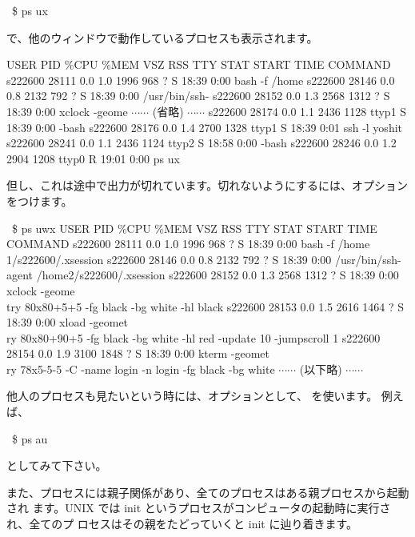 \documentclass[platex]{jsarticle}
\begin{document}
  \begin{terminal}~\$ ps ux\end{terminal}
  で、他のウィンドウで動作しているプロセスも表示されます。
  \begin{terminal}%
USER       PID \%CPU \%MEM   VSZ  RSS TTY      STAT START   TIME COMMAND
s222600  28111  0.0  1.0  1996  968 ?        S    18:39   0:00 bash -f /home
s222600  28146  0.0  0.8  2132  792 ?        S    18:39   0:00 /usr/bin/ssh-
s222600  28152  0.0  1.3  2568 1312 ?        S    18:39   0:00 xclock -geome
{\hfill $\cdots\cdots$ (省略) $\cdots\cdots$ \hfill}
s222600  28174  0.0  1.1  2436 1128 ttyp1    S    18:39   0:00 -bash
s222600  28176  0.0  1.4  2700 1328 ttyp1    S    18:39   0:01 ssh -l yoshit
s222600  28241  0.0  1.1  2436 1124 ttyp2    S    18:58   0:00 -bash
s222600  28246  0.0  1.2  2904 1208 ttyp0    R    19:01   0:00 ps ux\end{terminal}
  但し、これは途中で出力が切れています。切れないようにするには、オプション
   をつけます。
  \begin{terminal}%
~\$ ps uwx
USER       PID \%CPU \%MEM   VSZ  RSS TTY      STAT START   TIME COMMAND
s222600  28111  0.0  1.0  1996  968 ?        S    18:39   0:00 bash -f /home\\1/s222600/.xsession
s222600  28146  0.0  0.8  2132  792 ?        S    18:39   0:00 /usr/bin/ssh-\\agent /home2/s222600/.xsession
s222600  28152  0.0  1.3  2568 1312 ?        S    18:39   0:00 xclock -geome\\try 80x80+5+5 -fg black -bg white -hl black
s222600  28153  0.0  1.5  2616 1464 ?        S    18:39   0:00 xload -geomet\\ry 80x80+90+5 -fg black -bg white -hl red -update 10 -jumpscroll 1
s222600  28154  0.0  1.9  3100 1848 ?        S    18:39   0:00 kterm -geomet\\ry 78x5-5-5 -C -name login -n login -fg black -bg white
{\hfill $\cdots\cdots$ (以下略) $\cdots\cdots$ \hfill}
\end{terminal}
  他人のプロセスも見たいという時には、オプションとして、 を使います。
  例えば、
  \begin{terminal}~\$ ps au\end{terminal}
  としてみて下さい。

  また、プロセスには親子関係があり、全てのプロセスはある親プロセスから起動され
  ます。UNIX では init というプロセスがコンピュータの起動時に実行され、全てのプ
  ロセスはその親をたどっていくと init に辿り着きます。
\end{document}
